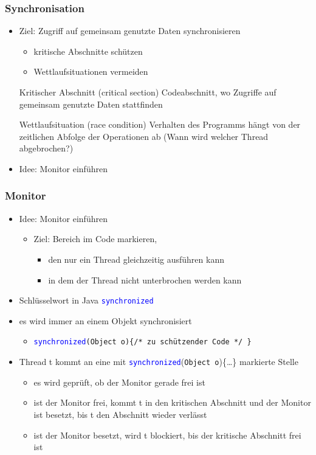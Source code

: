 \documentclass[18pt]{beamer}
\begin{document}
	\begin{frame}
		\frametitle{Synchronisation}
		\begin{itemize}
			\item Ziel: Zugriff auf gemeinsam genutzte Daten synchronisieren \pause 
			\begin{itemize}
				\item kritische Abschnitte schützen \pause
				\item Wettlaufsituationen vermeiden
			\end{itemize}
			\begin{block}{Kritischer Abschnitt (critical section)}
				Codeabschnitt, wo Zugriffe auf gemeinsam genutzte Daten stattfinden
			\end{block} \pause
			\begin{block}{Wettlaufsituation (race condition)}
				Verhalten des Programms hängt von der zeitlichen Abfolge der Operationen ab (Wann wird welcher Thread abgebrochen?)
			\end{block} \pause
			\item Idee: Monitor einführen
		\end{itemize}
	\end{frame}

	\begin{frame}
		\frametitle{Monitor}
		\begin{itemize}
			\item Idee: Monitor einführen \pause
			\begin{itemize}
				\item Ziel: Bereich im Code markieren,
				\begin{itemize}
					\item den nur ein Thread gleichzeitig ausführen kann
					\item in dem der Thread nicht unterbrochen werden kann
				\end{itemize}
			\end{itemize} \pause
			\item Schlüsselwort in Java \textcolor{blue}{\texttt{synchronized}} \pause
			\item es wird immer an einem Objekt synchronisiert
			\begin{itemize}
				\item \textcolor{blue}{\texttt{synchronized}}\texttt{(Object o)}\texttt{\{/* zu schützender Code */ \}} \pause
			\end{itemize} 
			\item Thread t kommt an eine mit \textcolor{blue}{\texttt{synchronized}}(\texttt{Object o})\{\dots\} markierte Stelle \pause
			\begin{itemize}
				\item es wird geprüft, ob der Monitor gerade frei ist \pause
				\item ist der Monitor frei, kommt t in den kritischen Abschnitt und der Monitor ist besetzt, bis t den Abschnitt wieder verlässt \pause
				\item ist der Monitor besetzt, wird t blockiert, bis der kritische Abschnitt frei ist
			\end{itemize}
		\end{itemize}
	\end{frame}
\end{document}
